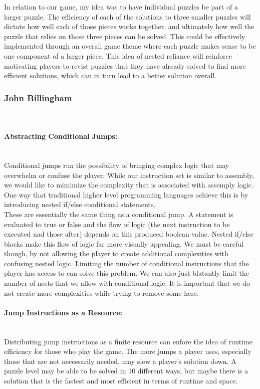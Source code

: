 In relation to our game, my idea was to have individual puzzles be part of a larger puzzle. The efficiency of each
of the solutions to three smaller puzzles will dictate how well each of those pieces works together, and ultimately
how well the puzzle that relies on those three pieces can be solved. This could be effectively implemented through
an overall game theme where each puzzle makes sense to be one component of a larger piece. This idea of nested
reliance will reinforce motivating players to revist puzzles that they have already solved to find more efficient solutions,
which can in turn lead to a better solution overall.\\

\subsubsection{John Billingham}\mbox{} \\
\paragraph{Abstracting Conditional Jumps:}\mbox{} \\
Conditional jumps run the possibility of bringing complex logic that may overwhelm
or confuse the player. While our instruction set is similar to assembly, we would like
to mimimize the complexity that is associated with assemply logic. One way that traditional
higher level programming languages achieve this is by introducing nested if/else conditional
statements.\\

These are essentially the same thing as a conditional jump. A statement is evaluated to
true or false and the flow of logic (the next instruction to be executed nad those after)
depends on this produced boolean value. Nested if/else blocks make this flow of logic
far more visually appealing. We must be careful though, by not allowing the player to create
additional complexities with confusing nested logic. Limiting the number of conditional
instructions that the player has access to can solve this problem. We can also just blatantly
limit the number of nests that we allow with conditional logic. It is important that we
do not create more complexities while trying to remove some here.\\

\paragraph{Jump Instructions as a Resource:}\mbox{} \\
Distributing jump instructions as a finite resource can enfore the idea of runtime
efficiency for those who play the game. The more jumps a player uses, especially those
that are not necessarily needed, may slow a player's solution down. A puzzle level may
be able to be solved in 10 different ways, but maybe there is a solution that is the fastest
and most efficient in terms of runtime and space.\\

